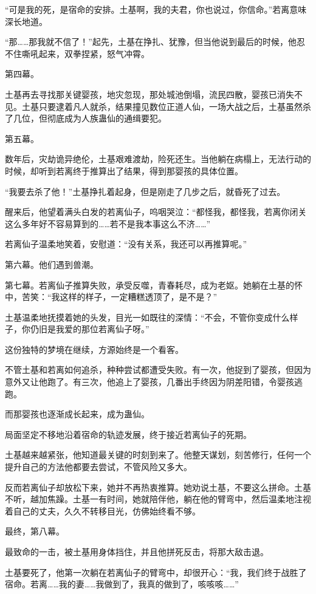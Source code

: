 \begin{this_body}
“可是我的死，是宿命的安排。土基啊，我的夫君，你也说过，你信命。”若离意味深长地道。

“那……那我就不信了！”起先，土基在挣扎、犹豫，但当他说到最后的时候，他忍不住嘶吼起来，双拳捏紧，怒气冲霄。

第四幕。

土基再去寻找那关键婴孩，地灾忽现，那处城池倒塌，流民四散，婴孩已消失不见。土基只要逮着凡人就杀，结果撞见数位正道人仙，一场大战之后，土基虽然杀了几位，但彻底成为人族蛊仙的通缉要犯。

第五幕。

数年后，灾劫诡异绝伦，土基艰难渡劫，险死还生。当他躺在病榻上，无法行动的时候，却听到若离终于推算出了结果，得到那婴孩的具体位置。

“我要去杀了他！”土基挣扎着起身，但是刚走了几步之后，就昏死了过去。

醒来后，他望着满头白发的若离仙子，呜咽哭泣：“都怪我，都怪我，若离你闭关这么多年好不容易算到的……若不是我本事这么不济……”

若离仙子温柔地笑着，安慰道：“没有关系，我还可以再推算呢。”

第六幕。他们遇到兽潮。

第七幕。若离仙子推算失败，承受反噬，青春耗尽，成为老妪。她躺在土基的怀中，苦笑：“我这样的样子，一定糟糕透顶了，是不是？”

土基温柔地抚摸着她的头发，目光一如既往的深情：“不会，不管你变成什么样子，你仍旧是我爱的那位若离仙子呀。”

这份独特的梦境在继续，方源始终是一个看客。

不管土基和若离如何追杀，种种尝试都遭受失败。有一次，他捉到了婴孩，但因为意外又让他跑了。有三次，他追上了婴孩，几番出手终因为阴差阳错，令婴孩逃跑。

而那婴孩也逐渐成长起来，成为蛊仙。

局面坚定不移地沿着宿命的轨迹发展，终于接近若离仙子的死期。

土基越来越紧张，他知道最关键的时刻到来了。他整天谋划，刻苦修行，任何一个提升自己的方法他都要去尝试，不管风险又多大。

反而若离仙子却放松下来，她并不再热衷推算。她劝说土基，不要这么拼命。土基不听，越加焦躁。土基一有时间，她就陪伴他，躺在他的臂弯中，然后温柔地注视着自己的丈夫，久久不转移目光，仿佛始终看不够。

最终，第八幕。

最致命的一击，被土基用身体挡住，并且他拼死反击，将那大敌击退。

土基要死了，他第一次躺在若离仙子的臂弯中，却很开心：“我，我们终于战胜了宿命。若离……我的妻……我做到了，我真的做到了，咳咳咳……”


\end{this_body}
